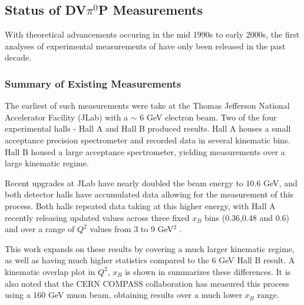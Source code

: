     
    \subsection{Status of DV\texorpdfstring{$\pi^0$}{pi0}P Measurements}


        With theoretical advancements occuring in the mid 1990s to early 2000s, the first analyses of experimental measurements of \dvpip have only been released in the past decade.
              
        \subsubsection*{Summary of Existing Measurements}

         The earliest of such measurements were take at the Thomas Jefferson National Accelerator Facility (JLab) with a $\sim$ 6 GeV electron beam. Two of the four experimental halls - Hall A \parencite{Fuchey2011ExclusiveRegime} and Hall B \parencite{Bedlinskiy2014ExclusiveCLAS} produced \xsec results. Hall A houses a small acceptance precision spectrometer and recorded data in several kinematic bins. Hall B housed a large acceptance spectrometer, yielding \xsec measurements over a large kinematic regime. 
         
         Recent upgrades at JLab have nearly doubled the beam energy to 10.6 GeV, and both detector halls have accumulated data allowing for the measurement of this process. Both halls repeated data taking at this higher energy, with Hall A recently releasing updated \xsec values across three fixed $x_B$ bins (0.36,0.48 and 0.6) and over a range of $Q^2$ values from 3 to 9 GeV$^2$ \parencite{Dlamini2021DeepRegime}. 
         
         This work expands on these results by covering a much larger kinematic regime, as well as having much higher statistics compared to the 6 GeV Hall B result. A kinematic overlap plot in $Q^2$, $x_B$ is shown in  summarizes these differences. It is also noted that the CERN COMPASS collaboration \parencite{Alexeev2020MeasurementProton} has measured this process using a 160 GeV muon beam, obtaining results over a much lower $x_B$ range.  

